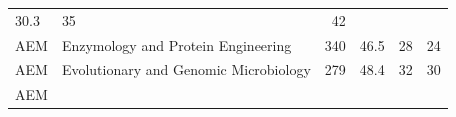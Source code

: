 \documentclass[11pt,]{article}
\begin{document}
\begin{longtable}[]{@{}llrrrr@{}}
\begin{minipage}[t]{0.08\columnwidth}
30.3\strut
\end{minipage} & \begin{minipage}[t]{0.11\columnwidth}\raggedleft\strut
35\strut
\end{minipage} & \begin{minipage}[t]{0.11\columnwidth}\raggedleft\strut
42\strut
\end{minipage}\tabularnewline
\begin{minipage}[t]{0.06\columnwidth}\raggedright\strut
AEM\strut
\end{minipage} & \begin{minipage}[t]{0.43\columnwidth}\raggedright\strut
Enzymology and Protein Engineering\strut
\end{minipage} & \begin{minipage}[t]{0.04\columnwidth}\raggedleft\strut
340\strut
\end{minipage} & \begin{minipage}[t]{0.08\columnwidth}\raggedleft\strut
46.5\strut
\end{minipage} & \begin{minipage}[t]{0.11\columnwidth}\raggedleft\strut
28\strut
\end{minipage} & \begin{minipage}[t]{0.11\columnwidth}\raggedleft\strut
24\strut
\end{minipage}\tabularnewline
\begin{minipage}[t]{0.06\columnwidth}\raggedright\strut
AEM\strut
\end{minipage} & \begin{minipage}[t]{0.43\columnwidth}\raggedright\strut
Evolutionary and Genomic Microbiology\strut
\end{minipage} & \begin{minipage}[t]{0.04\columnwidth}\raggedleft\strut
279\strut
\end{minipage} & \begin{minipage}[t]{0.08\columnwidth}\raggedleft\strut
48.4\strut
\end{minipage} & \begin{minipage}[t]{0.11\columnwidth}\raggedleft\strut
32\strut
\end{minipage} & \begin{minipage}[t]{0.11\columnwidth}\raggedleft\strut
30\strut
\end{minipage}\tabularnewline
\begin{minipage}[t]{0.06\columnwidth}\raggedright\strut
AEM\strut
\end{minipage} & \begin{minipage}[t]{0.43\columnwidth}\raggedright\strut

\end{minipage}
\end{longtable}
\end{document}
